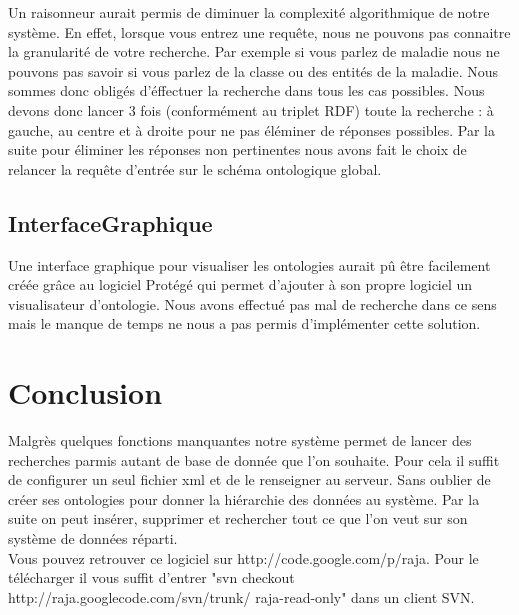 \documentclass[12pt]{article}
\begin{document}
	Un raisonneur aurait permis de diminuer la complexité algorithmique de notre système. En effet, lorsque vous entrez une requête, nous ne pouvons pas connaitre la granularité de votre recherche. Par exemple si vous parlez de maladie nous ne pouvons pas savoir si vous parlez de la classe ou des entités de la maladie. Nous sommes donc obligés d'éffectuer la recherche dans tous les cas possibles. Nous devons donc lancer 3 fois (conformément au triplet RDF) toute la recherche : à gauche, au centre et à droite pour ne pas éléminer de réponses possibles. Par la suite pour éliminer les réponses non pertinentes nous avons fait le choix de relancer la requête d'entrée sur le schéma ontologique global.

\subsection{InterfaceGraphique}

	Une interface graphique pour visualiser les ontologies aurait pû être facilement créée grâce au logiciel Protégé qui permet d'ajouter à son propre logiciel un visualisateur d'ontologie. Nous avons effectué pas mal de recherche dans ce sens mais le manque de temps ne nous a pas permis d'implémenter cette solution.

\section{Conclusion}

	Malgrès quelques fonctions manquantes notre système permet de lancer des recherches parmis autant de base de donnée que l'on souhaite. Pour cela il suffit de configurer un seul fichier xml et de le renseigner au serveur. Sans oublier de créer ses ontologies pour donner la hiérarchie des données au système. Par la suite on peut insérer, supprimer et rechercher tout ce que l'on veut sur son système de données réparti.\\
	\indent Vous pouvez retrouver ce logiciel sur http://code.google.com/p/raja. Pour le télécharger il vous suffit d'entrer "svn checkout http://raja.googlecode.com/svn/trunk/ raja-read-only" dans un client SVN.
\end{document}
